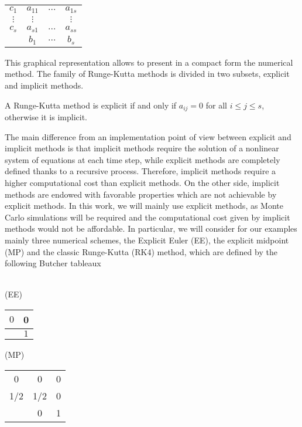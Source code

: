 \begin{center}
	\begin{tabular}{c|ccc}
		$c_1$ & $a_{11}$ & $\ldots$ & $a_{1s}$\\
		$\vdots$ & $\vdots$ & & $\vdots$ \\
		$c_s$ & $a_{s1}$ & $\ldots$ & $a_{ss}$\\
		\hline 
		&$b_1$ & $\ldots$ & $b_s$
	\end{tabular}
\end{center}
This graphical representation allows to present in a compact form the numerical method. The family of Runge-Kutta methods is divided in two subsets, explicit and implicit methods.
\begin{definition} A Runge-Kutta method is explicit if and only if $a_{ij} = 0$ for all $i \leq j \leq s$, otherwise it is implicit. 
\end{definition}
\noindent The main difference from an implementation point of view between explicit and implicit methods is that implicit methods require the solution of a nonlinear system of equations at each time step, while explicit methods are completely defined thanks to a recursive process. Therefore, implicit methods require a higher computational cost than explicit methods. On the other side, implicit methods are endowed with favorable properties which are not achievable by explicit methods. In this work, we will mainly use explicit methods, as Monte Carlo simulations will be required and the computational cost given by implicit methods would not be affordable. In particular, we will consider for our examples mainly three numerical schemes, the Explicit Euler (EE), the explicit midpoint (MP) and the classic Runge-Kutta (RK4) method, which are defined by the following Butcher tableaux \\ \\
\begin{minipage}{0.2\linewidth} 
	\begin{center}
		(EE)
		\begin{tabular}{c|c}
			$0$ & 0 \\
			\hline 
			&$1$ 
		\end{tabular}
	\end{center}
\end{minipage}
\begin{minipage}{0.3\linewidth} 
	\begin{center}
		(MP)
		\begin{tabular}{c|cc}
			0 & 0 & 0 \\
			1/2 & 1/2 & 0 \\
			\hline 
			& 0 & 1 
		\end{tabular}
	\end{center}
\end{minipage}
